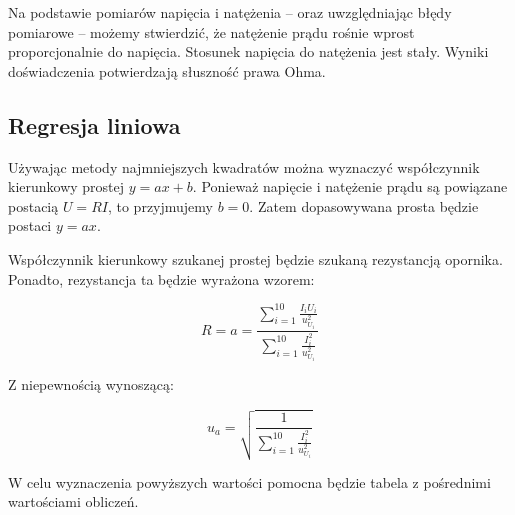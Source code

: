 \documentclass[a4paper]{article}
\begin{document}
Na podstawie pomiarów napięcia i natężenia -- oraz uwzględniając błędy pomiarowe -- możemy stwierdzić, że natężenie prądu rośnie wprost proporcjonalnie do napięcia.
Stosunek napięcia do natężenia jest stały.
Wyniki doświadczenia potwierdzają słuszność prawa Ohma.

\subsection{Regresja liniowa}

Używając metody najmniejszych kwadratów można wyznaczyć współczynnik kierunkowy prostej $y = ax + b$.
Ponieważ napięcie i natężenie prądu są powiązane postacią $U = RI$, to przyjmujemy $b = 0$.
Zatem dopasowywana prosta będzie postaci $y = ax$.

Współczynnik kierunkowy szukanej prostej będzie szukaną rezystancją opornika. Ponadto, rezystancja ta będzie wyrażona wzorem:

$$R = a = \frac{\sum_{i = 1}^{10}\frac{I_i U_i}{u_{U_i}^2}}{\sum_{i = 1}^{10}\frac{I_i^2}{u_{U_i}^2}}$$

Z niepewnością wynoszącą:

$$u_a = \sqrt{\frac{1}{\sum_{i = 1}^{10}\frac{I_i^2}{u_{U_i}^2}}}$$

W celu wyznaczenia powyższych wartości pomocna będzie tabela z pośrednimi wartościami obliczeń.
\end{document}
